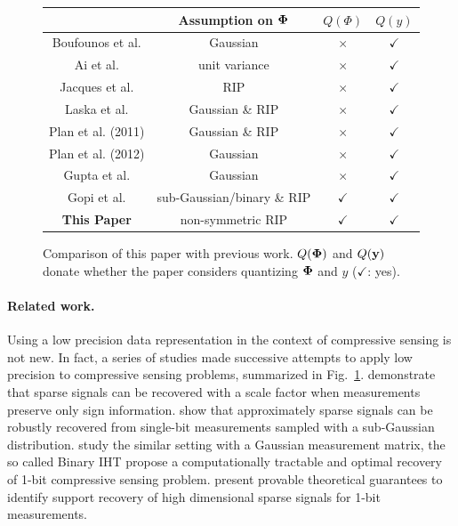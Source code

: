 \documentclass{article}
\begin{document}
\begin{figure}
\vspace{-1.25em}
\scriptsize
\centering
\begin{tabular}{c|c|cc}
\hline
                   & Assumption on ${\bf \Phi}$ & $Q(\Phi)$ & $Q(y)$ \\
\hline
 Boufounos et al.
 & Gaussian  &$\times$ & $\checkmark$\\
 Ai et al.         & unit variance &$\times$ & $\checkmark$\\
 Jacques et al.     &  RIP & $\times$& $\checkmark$\\
 Laska et al.     & Gaussian \& RIP &$\times$ & $\checkmark$\\
 Plan et al. (2011)     & Gaussian \& RIP &$\times$ & $\checkmark$\\
 Plan et al. (2012)      & Gaussian &$\times$ & $\checkmark$\\
 Gupta et al.     & Gaussian &$\times$ & $\checkmark$\\
 Gopi et al.       & sub-Gaussian/binary \& RIP &$\checkmark$ & $\checkmark$\\
\hline
  {\bf This Paper}                & non-symmetric RIP & $\checkmark$ & $\checkmark$ \\
\hline
\end{tabular}
\vspace{-1em}
\caption{Comparison of this paper with previous work. $Q({\bf \Phi})$ and $Q({\bf y})$ donate whether
the paper considers quantizing ${\bf \Phi}$ and $y$ 
($\checkmark$: yes).}
\label{tab:cs}
\end{figure}



\paragraph{Related work.}\label{section_related_work}
Using a low precision data representation in the context of compressive sensing
is not new. In fact, a series of studies made successive attempts to apply low precision  
to compressive sensing problems, summarized in
Fig.~\ref{tab:cs}. \cite{boufounos20091bitcs} demonstrate that sparse signals can be recovered with a scale factor when measurements preserve only sign information. \cite{ai20121bitcs, davenport20121bit} show that approximately sparse signals can be robustly recovered from single-bit measurements sampled with a sub-Gaussian distribution. \cite{jacques20111bit, laska20111bitcs} study the similar setting with a Gaussian measurement matrix, the so called Binary IHT \cite{plan20111bitcs, plan20121bitcs} propose a computationally tractable and optimal recovery of 1-bit compressive sensing problem. \cite{recht20121bitcs, gopi20131bitcs} present provable theoretical guarantees to identify support recovery of high dimensional sparse signals for 1-bit measurements. 
\end{document}
